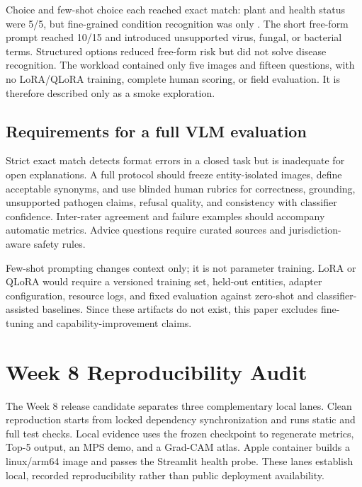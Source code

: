 \documentclass[11pt]{article}
\begin{document}


Choice and few-shot choice each reached \PDAVLMChoice{} exact match: plant and health status were 5/5, but fine-grained condition recognition was only \PDAVLMCondition{}. The short free-form prompt reached 10/15 and introduced unsupported virus, fungal, or bacterial terms. Structured options reduced free-form risk but did not solve disease recognition. The workload contained only five images and fifteen questions, with no LoRA/QLoRA training, complete human scoring, or field evaluation. It is therefore described only as a smoke exploration.

\subsection*{Requirements for a full VLM evaluation}

Strict exact match detects format errors in a closed task but is inadequate for open explanations. A full protocol should freeze entity-isolated images, define acceptable synonyms, and use blinded human rubrics for correctness, grounding, unsupported pathogen claims, refusal quality, and consistency with classifier confidence. Inter-rater agreement and failure examples should accompany automatic metrics. Advice questions require curated sources and jurisdiction-aware safety rules.

Few-shot prompting changes context only; it is not parameter training. LoRA or QLoRA would require a versioned training set, held-out entities, adapter configuration, resource logs, and fixed evaluation against zero-shot and classifier-assisted baselines. Since these artifacts do not exist, this paper excludes fine-tuning and capability-improvement claims.

\section{Week 8 Reproducibility Audit}

The Week 8 release candidate separates three complementary local lanes. Clean reproduction starts from locked dependency synchronization and runs static and full test checks. Local evidence uses the frozen checkpoint to regenerate metrics, Top-5 output, an MPS demo, and a Grad-CAM atlas. Apple container builds a linux/arm64 image and passes the Streamlit health probe. These lanes establish local, recorded reproducibility rather than public deployment availability.


\end{document}
